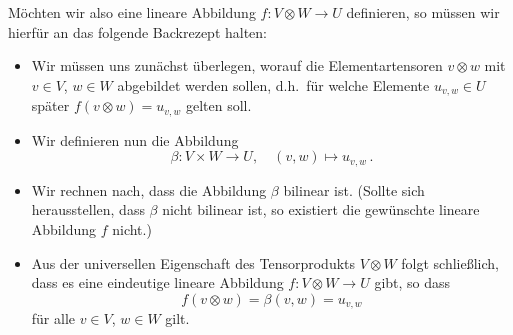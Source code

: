 Möchten wir also eine lineare Abbildung $f \colon V \otimes W \to U$ definieren, so müssen wir hierfür an das folgende Backrezept halten:

\begin{itemize}
  \item
    Wir müssen uns zunächst überlegen, worauf die Elementartensoren $v \otimes w$ mit $v \in V$, $w \in W$ abgebildet werden sollen, d.h.\ für welche Elemente $u_{v,w} \in U$ später $f(v \otimes w) = u_{v,w}$ gelten soll.
  \item
    Wir definieren nun die Abbildung
    \[
              \beta
      \colon  V \times W
      \to     U,
      \quad   (v,w)
      \mapsto u_{v,w} \,.
    \]
  \item
    Wir rechnen nach, dass die Abbildung $\beta$ bilinear ist.
    (Sollte sich herausstellen, dass $\beta$ nicht bilinear ist, so existiert die gewünschte lineare Abbildung $f$ nicht.)
  \item
    Aus der universellen Eigenschaft des Tensorprodukts $V \otimes W$ folgt schließlich, dass es eine eindeutige lineare Abbildung $f \colon V \otimes W \to U$ gibt, so dass
    \[
        f(v \otimes w)
      = \beta(v,w)
      = u_{v,w}
    \]
    für alle $v \in V$, $w \in W$ gilt.
\end{itemize}

